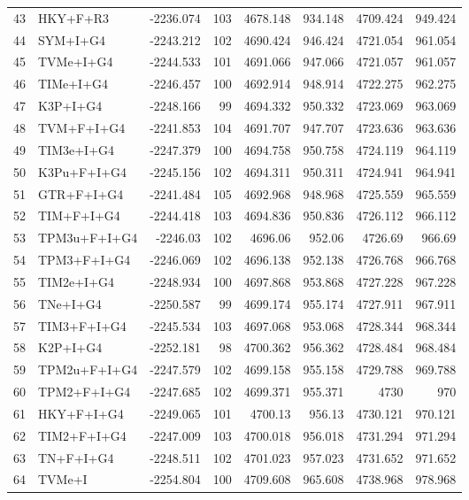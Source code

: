 \begin{longtable}{clrrrrrr}
	43 & HKY+F+R3 & -2236.074 & 103 & 4678.148 & 934.148 & 4709.424 & 949.424 \\ 
	44 & SYM+I+G4 & -2243.212 & 102 & 4690.424 & 946.424 & 4721.054 & 961.054 \\ 
	45 & TVMe+I+G4 & -2244.533 & 101 & 4691.066 & 947.066 & 4721.057 & 961.057 \\ 
	46 & TIMe+I+G4 & -2246.457 & 100 & 4692.914 & 948.914 & 4722.275 & 962.275 \\ 
	47 & K3P+I+G4 & -2248.166 & 99 & 4694.332 & 950.332 & 4723.069 & 963.069 \\ 
	48 & TVM+F+I+G4 & -2241.853 & 104 & 4691.707 & 947.707 & 4723.636 & 963.636 \\ 
	49 & TIM3e+I+G4 & -2247.379 & 100 & 4694.758 & 950.758 & 4724.119 & 964.119 \\ 
	50 & K3Pu+F+I+G4 & -2245.156 & 102 & 4694.311 & 950.311 & 4724.941 & 964.941 \\ 
	51 & GTR+F+I+G4 & -2241.484 & 105 & 4692.968 & 948.968 & 4725.559 & 965.559 \\ 
	52 & TIM+F+I+G4 & -2244.418 & 103 & 4694.836 & 950.836 & 4726.112 & 966.112 \\ 
	53 & TPM3u+F+I+G4 & -2246.03 & 102 & 4696.06 & 952.06 & 4726.69 & 966.69 \\ 
	54 & TPM3+F+I+G4 & -2246.069 & 102 & 4696.138 & 952.138 & 4726.768 & 966.768 \\ 
	55 & TIM2e+I+G4 & -2248.934 & 100 & 4697.868 & 953.868 & 4727.228 & 967.228 \\ 
	56 & TNe+I+G4 & -2250.587 & 99 & 4699.174 & 955.174 & 4727.911 & 967.911 \\ 
	57 & TIM3+F+I+G4 & -2245.534 & 103 & 4697.068 & 953.068 & 4728.344 & 968.344 \\ 
	58 & K2P+I+G4 & -2252.181 & 98 & 4700.362 & 956.362 & 4728.484 & 968.484 \\ 
	59 & TPM2u+F+I+G4 & -2247.579 & 102 & 4699.158 & 955.158 & 4729.788 & 969.788 \\ 
	60 & TPM2+F+I+G4 & -2247.685 & 102 & 4699.371 & 955.371 & 4730 & 970 \\ 
	61 & HKY+F+I+G4 & -2249.065 & 101 & 4700.13 & 956.13 & 4730.121 & 970.121 \\ 
	62 & TIM2+F+I+G4 & -2247.009 & 103 & 4700.018 & 956.018 & 4731.294 & 971.294 \\ 
	63 & TN+F+I+G4 & -2248.511 & 102 & 4701.023 & 957.023 & 4731.652 & 971.652 \\ 
	64 & TVMe+I & -2254.804 & 100 & 4709.608 & 965.608 & 4738.968 & 978.968 \\ 

\end{longtable}
